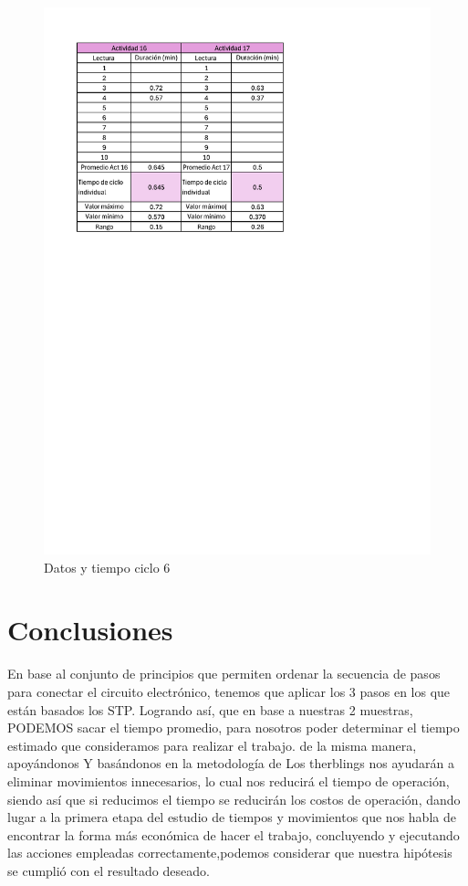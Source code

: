     \begin{figure}[H]
        \centering
        \includegraphics[trim = {15mm 100mm 20mm 
        0mm},clip,scale=0.4]{16/Img/muestreo6}
        \caption{Datos y tiempo ciclo 6}
        \label{fig:Datos y tiempo ciclo 6}
         \end{figure}
    \section{Conclusiones}
    
  En base al conjunto de principios que permiten ordenar la secuencia de pasos para conectar el circuito electrónico, tenemos que aplicar los 3 pasos en los que están basados los STP. Logrando así, que en base a nuestras 2 muestras, PODEMOS sacar el tiempo promedio, para nosotros poder determinar el tiempo estimado que consideramos para realizar el trabajo. de la misma manera, apoyándonos Y basándonos en la metodología de Los therblings nos ayudarán a eliminar movimientos innecesarios, lo cual nos reducirá el tiempo de operación, siendo así que si reducimos el tiempo se reducirán los costos de operación, dando lugar a la primera etapa del estudio de tiempos y movimientos que nos habla de encontrar la forma más económica de hacer el trabajo, concluyendo y ejecutando las acciones empleadas correctamente,podemos considerar que nuestra hipótesis se cumplió con el resultado deseado.
    
